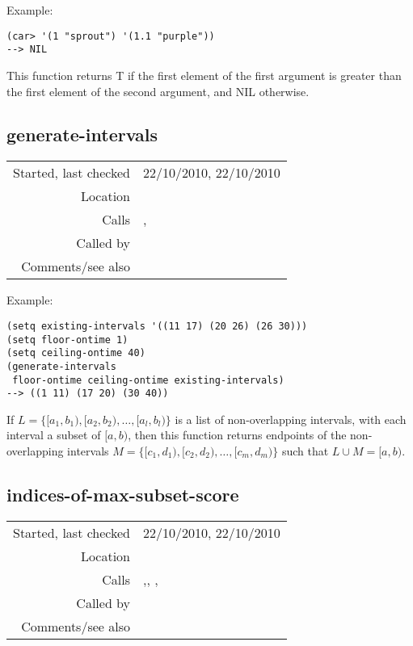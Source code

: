 \vspace{0.5cm}
\noindent Example:
\begin{verbatim}
(car> '(1 "sprout") '(1.1 "purple"))
--> NIL
\end{verbatim}

\noindent This function returns T if the first
element of the first argument is greater than the
first element of the second argument, and NIL
otherwise.


\subsection*{generate-intervals}\label{fun:generate-intervals}

\vspace{0.3cm}
\begin{tabular}{r|p{8cm}}
Started, last checked & 22/10/2010, 22/10/2010 \\
Location & \nameref{sec:generating-with-patterns-preliminaries} \\
Calls & \nameref{fun:interval-intersectionsp}, \nameref{fun:interval-subsetsp} \\
Called by & \\
Comments/see also &
\end{tabular}

\vspace{0.5cm}
\noindent Example:
\begin{verbatim}
(setq existing-intervals '((11 17) (20 26) (26 30)))
(setq floor-ontime 1)
(setq ceiling-ontime 40)
(generate-intervals
 floor-ontime ceiling-ontime existing-intervals)
--> ((1 11) (17 20) (30 40))
\end{verbatim}

\noindent If $L = \{[a_1, b_1), [a_2, b_2),\ldots,
[a_l, b_l)\}$ is a list of non-overlapping intervals,
with each interval a subset of $[a, b)$, then this
function returns endpoints of the non-overlapping
intervals $M = \{[c_1, d_1), [c_2, d_2),\ldots,
[c_m, d_m)\}$ such that $L \cup M = [a, b)$.


\subsection*{indices-of-max-subset-score}\label{fun:indices-of-max-subset-score}

\vspace{0.3cm}
\begin{tabular}{r|p{8cm}}
Started, last checked & 22/10/2010, 22/10/2010 \\
Location & \nameref{sec:generating-with-patterns-preliminaries} \\
Calls & \nameref{fun:merge-sort-by-car>},\newline \nameref{fun:merge-sort-by-vector<vector-car}, \nameref{fun:my-last},\newline \nameref{fun:unaddressed-patterns-subset-scores} \\
Called by & \\
Comments/see also &
\end{tabular}

